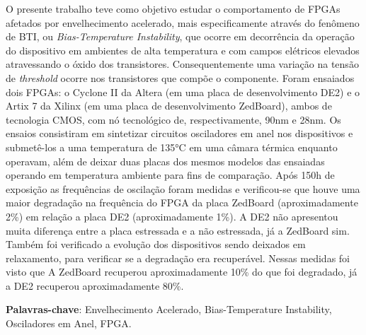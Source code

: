 \begin{resumo}[Resumo]
O presente trabalho teve como objetivo estudar o comportamento de FPGAs afetados por envelhecimento acelerado, mais especificamente através do fenômeno de BTI, ou \textit{Bias-Temperature Instability}, que ocorre em decorrência da operação do dispositivo em ambientes de alta temperatura e com campos elétricos elevados atravessando o óxido dos transistores. Consequentemente uma variação na tensão de \textit{threshold} ocorre nos transistores que compõe o componente. Foram ensaiados dois FPGAs: o Cyclone II da Altera (em uma placa de desenvolvimento DE2) e o Artix 7 da Xilinx (em uma placa de desenvolvimento ZedBoard), ambos de tecnologia CMOS, com nó tecnológico de, respectivamente, 90nm e 28nm. Os ensaios consistiram em sintetizar circuitos osciladores em anel nos dispositivos e submetê-los a uma temperatura de 135°C em uma câmara térmica enquanto operavam, além de deixar duas placas dos mesmos modelos das ensaiadas operando em temperatura ambiente para fins de comparação. Após 150h de exposição as frequências de oscilação foram medidas e verificou-se que houve uma maior degradação na frequência do FPGA da placa ZedBoard (aproximadamente 2\%) em relação a placa DE2 (aproximadamente 1\%). A DE2 não apresentou muita diferença entre a placa estressada e a não estressada, já a ZedBoard sim. Também foi verificado a evolução dos dispositivos sendo deixados em relaxamento, para verificar se a degradação era recuperável. Nessas medidas foi visto que A ZedBoard recuperou aproximadamente 10\% do que foi degradado, já a DE2 recuperou aproximadamente 80\%.


    \vspace{\onelineskip}
	\noindent
        
	\textbf{Palavras-chave}: Envelhecimento Acelerado, Bias-Temperature Instability, Osciladores em Anel, FPGA.

\end{resumo}

\setlength{\absparsep}{18pt} 

